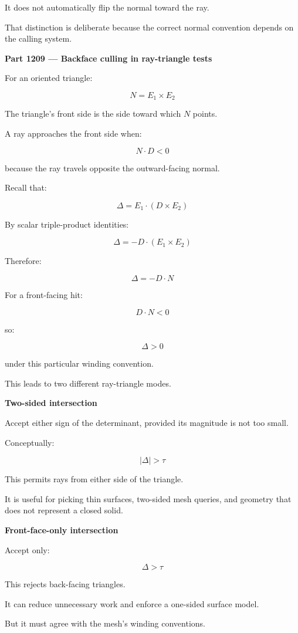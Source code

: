It does not automatically flip the normal toward the ray.

That distinction is deliberate because the correct normal convention depends on the calling system.

\textbf{Part 1209 --- Backface culling in ray-triangle tests}

For an oriented triangle:

\[
N=E_1\times E_2
\]

The triangle's front side is the side toward which \(N\) points.

A ray approaches the front side when:

\[
\boxed{ N\cdot D<0 }
\]

because the ray travels opposite the outward-facing normal.

Recall that:

\[
\Delta=E_1\cdot(D\times E_2)
\]

By scalar triple-product identities:

\[
\boxed{ \Delta=-D\cdot(E_1\times E_2) }
\]

Therefore:

\[
\Delta=-D\cdot N
\]

For a front-facing hit:

\[
D\cdot N<0
\]

so:

\[
\boxed{\Delta>0}
\]

under this particular winding convention.

This leads to two different ray-triangle modes.

\textbf{Two-sided intersection}

Accept either sign of the determinant, provided its magnitude is not too small.

Conceptually:

\[
|\Delta|>\tau
\]

This permits rays from either side of the triangle.

It is useful for picking thin surfaces, two-sided mesh queries, and geometry that does not represent a closed solid.

\textbf{Front-face-only intersection}

Accept only:

\[
\Delta>\tau
\]

This rejects back-facing triangles.

It can reduce unnecessary work and enforce a one-sided surface model.

But it must agree with the mesh's winding conventions.

